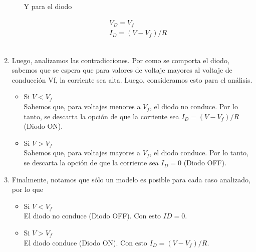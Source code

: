 \documentclass[11pt,fancy,lang=es]{elegantbook}
\begin{document}
\begin{enumerate}
\begin{itemize}
                    Y para el diodo

                    \begin{align*}
                        V_D=V_f \\
                        I_D= (V - V_f)/R
                    \end{align*}
                    \\


          \end{itemize}
    \item Luego, analizamos las contradicciones. Por como se comporta el diodo, sabemos que se espera que para valores de voltaje mayores al voltaje de conducción Vf, la corriente sea alta. Luego, consideramos esto para el análisis.
          \begin{itemize}
              \item Si $V<V_f$\\
                    Sabemos que, para voltajes menores a $V_f$, el diodo no conduce. Por lo tanto, se descarta la opción de que la corriente sea $I_D= (V - V_f)/R$ (Diodo ON).
              \item Si $V>V_f$\\
                    Sabemos que, para voltajes mayores a $V_f$, el diodo conduce. Por lo tanto, se descarta la opción de que la corriente sea $I_D=0$ (Diodo OFF).
          \end{itemize}

    \item Finalmente, notamos que sólo un modelo es posible para cada caso analizado, por lo que
          \begin{itemize}
              \item Si $V<V_f$\\
                    El diodo no conduce (Diodo OFF). Con esto $ID=0$.
              \item Si $V>V_f$\\
                    El diodo conduce (Diodo ON). Con esto $ I_D= (V - V_f)/R$.
          \end{itemize}
\end{enumerate}


\iffalse
\end{document}
